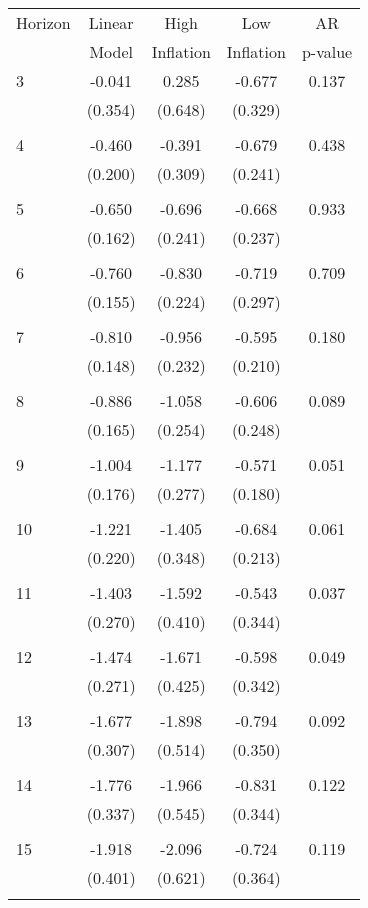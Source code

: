 \begin{tabular}{l*{1}{cccc}}
\hline\hline
 Horizon  & Linear & High                 & Low           & AR            \\
                  & Model         & Inflation & Inflation & p-value       \\
\hline
   3       & -0.041 & 0.285 & -0.677 & 0.137 \\
          & (0.354) & (0.648) & (0.329) & \\
 & & & &\\
   4       & -0.460 & -0.391 & -0.679 & 0.438 \\
          & (0.200) & (0.309) & (0.241) & \\
 & & & &\\
   5       & -0.650 & -0.696 & -0.668 & 0.933 \\
          & (0.162) & (0.241) & (0.237) & \\
 & & & &\\
   6       & -0.760 & -0.830 & -0.719 & 0.709 \\
          & (0.155) & (0.224) & (0.297) & \\
 & & & &\\
   7       & -0.810 & -0.956 & -0.595 & 0.180 \\
          & (0.148) & (0.232) & (0.210) & \\
 & & & &\\
   8       & -0.886 & -1.058 & -0.606 & 0.089 \\
          & (0.165) & (0.254) & (0.248) & \\
 & & & &\\
   9       & -1.004 & -1.177 & -0.571 & 0.051 \\
          & (0.176) & (0.277) & (0.180) & \\
 & & & &\\
  10       & -1.221 & -1.405 & -0.684 & 0.061 \\
          & (0.220) & (0.348) & (0.213) & \\
 & & & &\\
  11       & -1.403 & -1.592 & -0.543 & 0.037 \\
          & (0.270) & (0.410) & (0.344) & \\
 & & & &\\
  12       & -1.474 & -1.671 & -0.598 & 0.049 \\
          & (0.271) & (0.425) & (0.342) & \\
 & & & &\\
  13       & -1.677 & -1.898 & -0.794 & 0.092 \\
          & (0.307) & (0.514) & (0.350) & \\
 & & & &\\
  14       & -1.776 & -1.966 & -0.831 & 0.122 \\
          & (0.337) & (0.545) & (0.344) & \\
 & & & &\\
  15       & -1.918 & -2.096 & -0.724 & 0.119 \\
          & (0.401) & (0.621) & (0.364) & \\
 & & & &\\
\hline\hline
\end{tabular}
